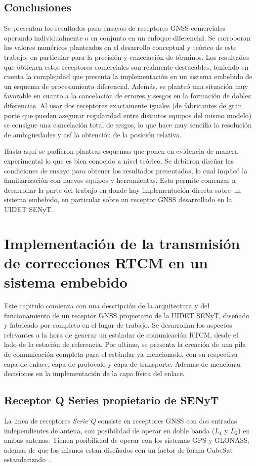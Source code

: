 \documentclass[a4paper,12pt,oneside,onecolumn,final,openright]{book}%
\begin{document}
\section{Conclusiones}
	Se presentan los resultados para ensayos de receptores GNSS comerciales operando individualmente o en conjunto en un enfoque diferencial. Se corroboran los valores numéricos planteados en el desarrollo conceptual y teórico de este trabajo, en particular para la precisión y cancelación de términos. Los resultados que obtienen estos receptores comerciales son realmente destacables, teniendo en cuenta la complejidad que presenta la implementación en un sistema embebido de un esquema de procesamiento diferencial. Además, se planteó una situación muy favorable en cuanto a la cancelación de errores y sesgos en la formación de dobles diferencias. Al usar dos receptores exactamente iguales (de fabricantes de gran porte que pueden asegurar regularidad entre distintos equipos del mismo modelo) se consigue una cancelación total de sesgos, lo que hace muy sencilla la resolución de ambigüedades y así la obtención de la posición relativa. 
	
	Hasta aquí se pudieron plantear esquemas que ponen en evidencia de manera experimental lo que es bien conocido a nivel teórico. Se debieron diseñar las condiciones de ensayo para obtener los resultados presentados, lo cual implicó la familiarización con nuevos equipos y herramientas. Esto permite comenzar a desarrollar la parte del trabajo en donde hay implementación directa sobre un sistema embebido, en particular sobre un receptor GNSS desarrollado en la UIDET SENyT.

\chapter{Implementación de la transmisión de correcciones RTCM en un sistema embebido} 
	Este capitulo comienza con una descripción de la arquitectura y del funcionamiento de un receptor GNSS propietario de la UIDET SENyT, diseñado y fabricado por completo en el lugar de trabajo. Se desarrollan los aspectos relevantes a la hora de generar un estándar de comunicación RTCM, desde el lado de la estación de referencia. Por ultimo, se presenta la creación de una pila de comunicación completa para el estándar ya mencionado, con su respectiva capa de enlace, capa de protocolo y capa de transporte. Ademas de mencionar decisiones en la implementación de la capa física del enlace.
\section{Receptor Q Series propietario de SENyT}
	La linea de receptores \textit{Serie Q} consiste en receptores GNSS con dos entradas independientes de antena, con posibilidad de operar en doble banda ($L_1$ y $L_2$) en ambas antenas. Tienen posibilidad de operar con los sistemas GPS y GLONASS, ademas de que los mismos estan diseñados con un factor de forma CubeSat estandarizado~\cite{Qseries_1}\cite{Qseries_2}.
\end{document}
